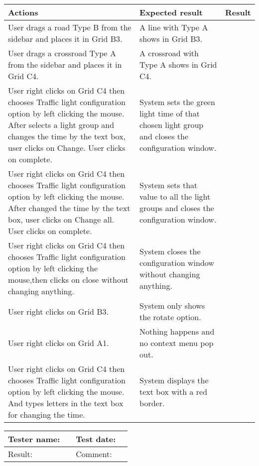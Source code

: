 	\begin{tabularx}{\textwidth}{|X|X|p{2.5cm}|}\hline
		Actions & Expected result & Result \\\hline

		User drags a road Type B from the sidebar and places it in Grid B3. & A line with Type A shows in Grid B3. & \pass \\\hline
		User drags a crossroad Type A from the sidebar and places it in Grid C4. & A crossroad with Type A shows in Grid C4. & \pass \\\hline
		User right clicks on Grid C4 then chooses Traffic light configuration  option by left clicking the mouse. After selects a light group and changes the time by the text box, user clicks on Change. User clicks on complete. & System sets the green light time of that chosen light group and closes the configuration window.  & \pass \\\hline
		User right clicks on Grid C4 then chooses Traffic light configuration option by left clicking the mouse. After changed the time by the text box, user clicks on Change all. User clicks on complete. & System sets that value to all the light groups and closes the configuration window. & \pass \\\hline
		User right clicks on Grid C4 then chooses Traffic light configuration option by left clicking the mouse,then clicks on close without changing anything. & System closes the configuration window without changing anything. & \pass \\\hline
		User right clicks on Grid B3. & System only shows the rotate option. & \pass \\\hline
		User right clicks on Grid A1. & Nothing happens and no context menu pop out. & \pass \\\hline
		User right clicks on Grid C4 then chooses Traffic light configuration option by left clicking the mouse. And types letters in the text box for changing the time.& System displays the text box with a red border. & \pass \\\hline
	\end{tabularx}
		


\begin{tabularx}{\textwidth}{|p{3cm}X|p{3cm}X|}\hline
	Tester name: &  & Test date: & \\\hline
	Result: &   \pass & Comment: & \\\hline
\end{tabularx}

\newpage

